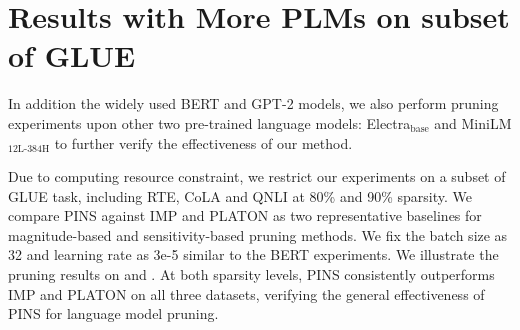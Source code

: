 
\section{Results with More PLMs on subset of GLUE}
\label{sec:A}
In addition the widely used BERT and GPT-2 models, we also perform pruning experiments upon other two pre-trained language models: Electra$_{\text{base}}$ and MiniLM$_{\text{12L-384H}}$ to further verify the effectiveness of our method. 

Due to computing resource constraint, we restrict our experiments on a subset of GLUE task, including RTE, CoLA and QNLI at 80\% and 90\% sparsity. We compare PINS against IMP and PLATON as two representative baselines for magnitude-based and sensitivity-based pruning methods. We fix the batch size as 32 and learning rate as 3e-5 similar to the BERT experiments. We illustrate the pruning results on  and . At both sparsity levels, PINS consistently outperforms IMP and PLATON on all three datasets, verifying the general effectiveness of PINS for language model pruning.
